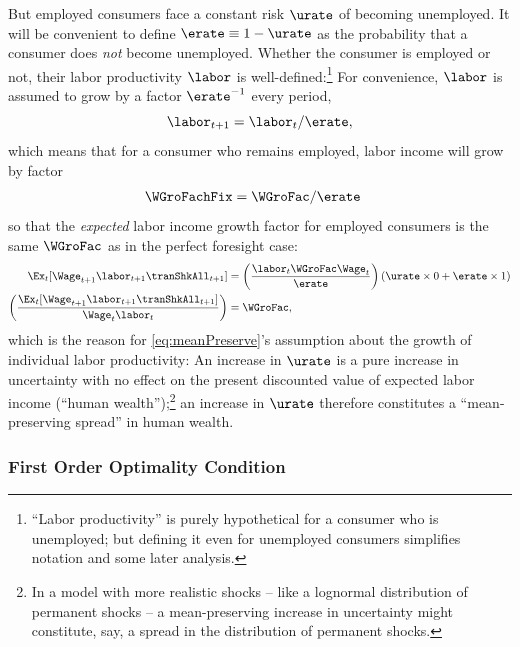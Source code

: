 \documentclass{econark}
\begin{document}
But employed consumers face a constant risk $\urate$ of becoming unemployed.  
It will be convenient to define $\erate\equiv 1-\urate$ as the probability that a consumer does {\it not} become unemployed.  Whether the consumer is employed or not, their labor productivity $\labor$ is well-defined:\footnote{``Labor productivity'' is purely hypothetical for a consumer who is unemployed; but defining it even for unemployed consumers simplifies notation and some later analysis.}  For convenience, $\labor$ is assumed to grow by a factor $\erate^{-1}$ every period,
\begin{equation}
\labor_{t+1} =    \labor_{t}/\erate \label{eq:meanPreserve},
\end{equation}
which means that for a consumer who remains employed, labor income will grow by factor
\begin{equation}\begin{gathered}\begin{aligned}
  \WGroFachFix & =  \WGroFac/\erate
\end{aligned}\end{gathered}\end{equation}
so that the {\it expected} labor income growth factor for
employed consumers is the same $\WGroFac$ as in the perfect foresight case:
\begin{equation}\begin{gathered}\begin{aligned}
  \Ex_{t}[\Wage_{t+1}\labor_{t+1}\tranShkAll_{t+1}] & =   \left(\frac{\labor_{t} \WGroFac \Wage_{t}}{\erate}\right)\left(\urate \times 0 + \erate \times 1 \right)
\\ \left(\frac{\Ex_{t}[\Wage_{t+1}\labor_{t+1}\tranShkAll_{t+1}]}{\Wage_{t} \labor_{t}}\right) &  =  \WGroFac
,
\end{aligned}\end{gathered}\end{equation}
which is  the reason for \eqref{eq:meanPreserve}'s assumption about the growth of
individual labor productivity: An increase in $\urate$ is a pure increase in uncertainty with no
effect on the present discounted value of expected labor income (``human wealth'');\footnote{In a model with more realistic shocks -- like a lognormal distribution of permanent shocks -- a mean-preserving increase in uncertainty might constitute, say, a spread in the distribution of permanent shocks.} an increase in $\urate$ therefore constitutes a ``mean-preserving spread'' in human wealth.

\subsubsection{First Order Optimality Condition}
\end{document}
